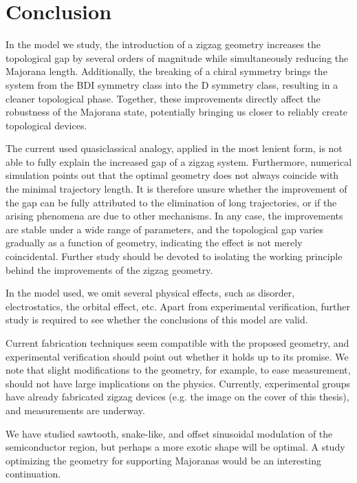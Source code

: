 \chapter{Conclusion}\label{chap:conclusion}
In the model we study, the introduction of a zigzag geometry increases the topological gap by several orders of magnitude while simultaneously reducing the Majorana length.
Additionally, the breaking of a chiral symmetry brings the system from the BDI symmetry class into the D symmetry class, resulting in a cleaner topological phase.  %
Together, these improvements directly affect the robustness of the Majorana state, potentially bringing us closer to reliably create topological devices.

The current used quasiclassical analogy, applied in the most lenient form, is not able to fully explain the increased gap of a zigzag system.
Furthermore, numerical simulation points out that the optimal geometry does not always coincide with the minimal trajectory length.
It is therefore unsure whether the improvement of the gap can be fully attributed to the elimination of long trajectories, or if the arising phenomena are due to other mechanisms.
In any case, the improvements are stable under a wide range of parameters, and the topological gap varies gradually as a function of geometry, indicating the effect is not merely coincidental.
Further study should be devoted to isolating the working principle behind the improvements of the zigzag geometry.

In the model used, we omit several physical effects, such as disorder, electrostatics, the orbital effect, etc.  %
Apart from experimental verification, further study is required to see whether the conclusions of this model are valid.  %

Current fabrication techniques seem compatible with the proposed geometry, and experimental verification should point out whether it holds up to its promise.
We note that slight modifications to the geometry, for example, to ease measurement, should not have large implications on the physics.
Currently, experimental groups have already fabricated zigzag devices (e.g. the image on the cover of this thesis), and measurements are underway.

We have studied sawtooth, snake-like, and offset sinusoidal modulation of the semiconductor region, but perhaps a more exotic shape will be optimal. %
A study optimizing the geometry for supporting Majoranas would be an interesting continuation.
